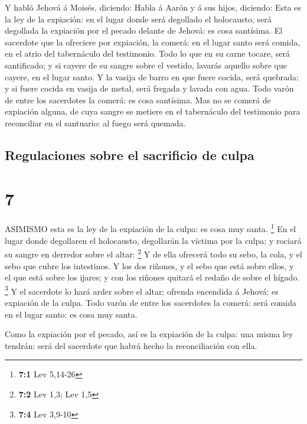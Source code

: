  Y habló Jehová á Moisés, diciendo:  Habla á
Aarón y á sus hijos, diciendo: Esta es la ley de la expiación: en el
lugar donde será degollado el holocausto, será degollada la expiación
por el pecado delante de Jehová: es cosa santísima.  El
sacerdote que la ofreciere por expiación, la comerá: en el lugar santo
será comida, en el atrio del tabernáculo del testimonio. 
Todo lo que en su carne tocare, será santificado; y si cayere de su
sangre sobre el vestido, lavarás aquello sobre que cayere, en el lugar
santo.  Y la vasija de barro en que fuere cocida, será
quebrada: y si fuere cocida en vasija de metal, será fregada y lavada
con agua.  Todo varón de entre los sacerdotes la comerá: es
cosa santísima.  Mas no se comerá de expiación alguna, de
cuya sangre se metiere en el tabernáculo del testimonio para reconciliar
en el santuario: al fuego será quemada.

\hypertarget{regulaciones-sobre-el-sacrificio-de-culpa}{%
\subsection{Regulaciones sobre el sacrificio de
culpa}\label{regulaciones-sobre-el-sacrificio-de-culpa}}

\hypertarget{section-6}{%
\section{7}\label{section-6}}

 ASIMISMO esta es la ley de la expiación de la culpa: es
cosa muy santa. \footnote{\textbf{7:1} Lev 5,14-26}  En el
lugar donde degollaren el holocausto, degollarán la víctima por la
culpa; y rociará su sangre en derredor sobre el altar: \footnote{\textbf{7:2}
  Lev 1,3; Lev 1,5}  Y de ella ofrecerá todo su sebo, la
cola, y el sebo que cubre los intestinos.  Y los dos
riñones, y el sebo que está sobre ellos, y el que está sobre los ijares;
y con los riñones quitará el redaño de sobre el hígado. \footnote{\textbf{7:4}
  Lev 3,9-10}  Y el sacerdote lo hará arder sobre el altar;
ofrenda encendida á Jehová: es expiación de la culpa.  Todo
varón de entre los sacerdotes la comerá: será comida en el lugar santo:
es cosa muy santa.

 Como la expiación por el pecado, así es la expiación de la
culpa: una misma ley tendrán: será del sacerdote que habrá hecho la
reconciliación con ella.

